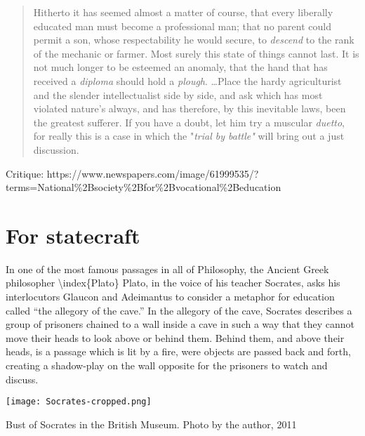 \begin{quote}

Hitherto it has seemed almost a matter of course, that every liberally educated man must become a professional man; that no parent could permit a son, whose respectability he would secure, to \emph{descend} to the rank of the mechanic or farmer. Most surely this state of things cannot last. It is not much longer to be esteemed an anomaly, that the hand that has received a \emph{diploma} should hold a \emph{plough}. {\ldots}Place the hardy agriculturist and the slender intellectualist side by side, and ask which has most violated nature's always, and has therefore, by this inevitable laws, been the greatest sufferer. If you have a doubt, let him try a muscular \emph{duetto}, for really this is a case in which the "\emph{trial by battle"} will bring out a just discussion. ~\citep[P. 97--98]{Whedon:1852vp}
\end{quote}

Critique: https:\slash \slash www.newspapers.com\slash image\slash 61999535\slash ?terms=National\%2Bsociety\%2Bfor\%2Bvocational\%2Beducation

\chapter{For statecraft}
\label{forstatecraft}


In one of the most famous passages in all of Philosophy, the Ancient Greek philosopher \textbackslash{}index\{Plato\} Plato, in the voice of his teacher Socrates, asks his interlocutors Glaucon and Adeimantus to consider a metaphor for education called ``the allegory of the cave.'' In the allegory of the cave, Socrates describes a group of prisoners chained to a wall inside a cave in such a way that they cannot move their heads to look above or behind them. Behind them, and above their heads, is a passage which is lit by a fire, were objects are passed back and forth, creating a shadow-play on the wall opposite for the prisoners to watch and discuss. \begin{marginfigure}\texttt{[image: Socrates-cropped.png]}\caption{Bust of Socrates in the British Museum. Photo by the author, 2011}\label{fig:socrates}\end{marginfigure}


